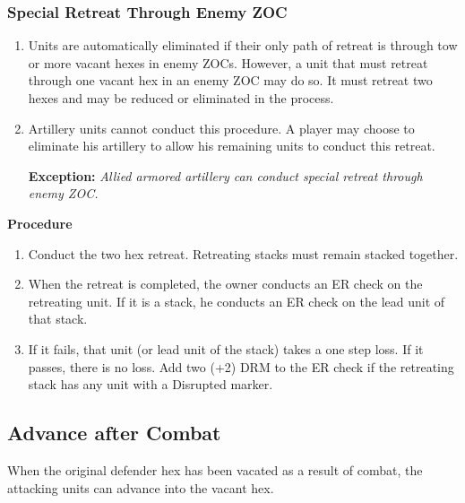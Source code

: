 \subsubsection{\textbf{Special Retreat Through Enemy ZOC}}

\begin{enumerate}[label=\alph*.]
    \item Units are automatically eliminated if their only path of retreat is through tow or more vacant hexes in enemy ZOCs. However, a unit that must retreat through one vacant hex in an enemy ZOC may do so. It must retreat two hexes and may be reduced or eliminated in the process.
    \item Artillery units cannot conduct this procedure. A player may choose to eliminate his artillery to allow his remaining units to conduct this retreat.
    
    \textbf{Exception:} \textit{Allied armored artillery can conduct special retreat through enemy ZOC.}
\end{enumerate}

\textbf{Procedure}

\begin{enumerate}[label=\Roman*.]
    \item Conduct the two hex retreat. Retreating stacks must remain stacked together.
    \item When the retreat is completed, the owner conducts an ER check on the retreating unit. If it is a stack, he conducts an ER check on the lead unit of that stack.
    \item If it fails, that unit (or lead unit of the stack) takes a one step loss. If it passes, there is no loss. Add two (+2) DRM to the ER check if the retreating stack has any unit with a Disrupted marker.
\end{enumerate}

\subsection{Advance after Combat}

When the original defender hex has been vacated as a result of combat, the attacking units can advance into the vacant hex.
